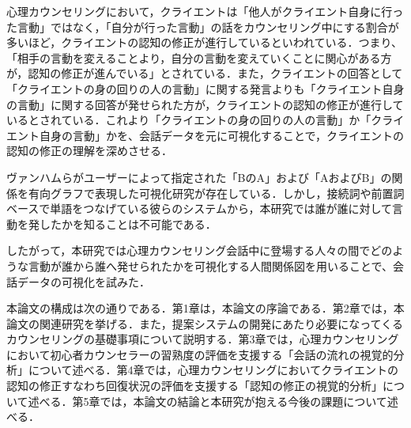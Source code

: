 \documentclass[shuuron]{kuee}
\begin{document}
心理カウンセリングにおいて，クライエントは「他人がクライエント自身に行った言動」ではなく，「自分が行った言動」の話をカウンセリング中にする割合が多いほど，クライエントの認知の修正が進行しているといわれている．つまり、「相手の言動を変えることより，自分の言動を変えていくことに関心がある方が，認知の修正が進んでいる」\cite{zokad}とされている．また，クライエントの回答として「クライエントの身の回りの人の言動」に関する発言よりも「クライエント自身の言動」に関する回答が発せられた方が，クライエントの認知の修正が進行しているとされている．これより「クライエントの身の回りの人の言動」か「クライエント自身の言動」かを、会話データを元に可視化することで，クライエントの認知の修正の理解を深めさせる．

ヴァンハム\cite{van2009mapping}らがユーザーによって指定された「BのA」および「AおよびB」の関係を有向グラフで表現した可視化研究が存在している．しかし，接続詞や前置詞ベースで単語をつなげている彼らのシステムから，本研究では誰が誰に対して言動を発したかを知ることは不可能である．


したがって，本研究では心理カウンセリング会話中に登場する人々の間でどのような言動が誰から誰へ発せられたかを可視化する人間関係図を用いることで、会話データの可視化を試みた．

本論文の構成は次の通りである．第1章は，本論文の序論である．第2章では，本論文の関連研究を挙げる．また，提案システムの開発にあたり必要になってくるカウンセリングの基礎事項について説明する．第3章では，心理カウンセリングにおいて初心者カウンセラーの習熟度の評価を支援する「会話の流れの視覚的分析」について述べる．第4章では，心理カウンセリングにおいてクライエントの認知の修正すなわち回復状況の評価を支援する「認知の修正の視覚的分析」について述べる．第5章では，本論文の結論と本研究が抱える今後の課題について述べる．

%
\end{document}
